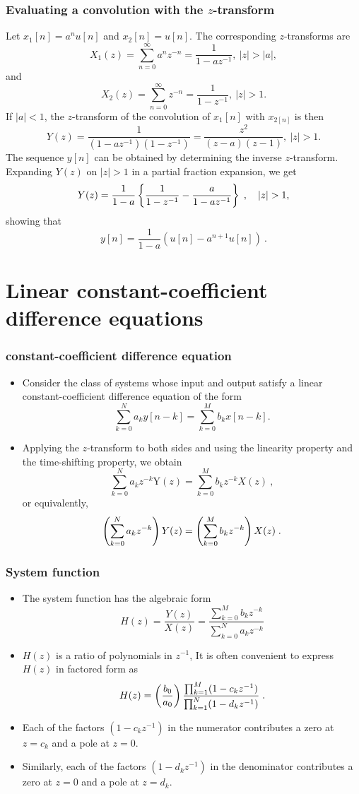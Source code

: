 \begin{frame}
\frametitle{Evaluating a convolution with the $z$-transform}
Let $x_{1}[n]=a^{n}u[n]$ and $x_{2}[n]=u[n]$. The corresponding $z$-transforms are
$$
X_{1}(z)=\sum_{n=0}^{\infty}a^{n}z^{-n}=\frac{1}{1-az^{-1}},\ |z|>|a|,
$$
and
$$
X_{2}(z)=\sum_{n=0}^{\infty}z^{-n}=\frac{1}{1-z^{-1}},\ |z|>1.
$$
If $|a|<1$, the $z$-transform of the convolution of $x_{1}[n]$ with $x_{2[n]}$ is then
$$
Y(z)=\frac{1}{(1-az^{-1})(1-z^{-1})}=\frac{z^{2}}{(z-a)(z-1)},\ |z|>1.
$$
The sequence $y[n]$ can be obtained by determining the inverse $z$-transform. Expanding $Y(z)$ on $|z|> 1$ in a partial fraction expansion, we get
$$
Y(z)=\frac{1}{1-a} \left\{ \frac{1}{1-z^{-1}}-\frac{a}{1-az^{-1}} \right\} \eqsp, \quad |z|>1,
$$
showing that
$$
y[n]=\frac{1}{1-a}(u[n]-a^{n+1}u[n])\ .
$$
\end{frame}


\section{Linear constant-coefficient difference equations}
\begin{frame}
\frametitle{constant-coefficient difference equation}
\begin{itemize}
\item Consider the class of systems whose input and output satisfy a linear constant-coefficient difference equation of the form
\alert{
$$
\sum_{k=0}^{N}a_{k}y[n-k]=\sum_{k=0}^{M}b_{k}x[n-k].
$$
}
\item Applying the $z$-transform to both sides  and using the \alert{linearity property} and the \alert{time-shifting} property,
we obtain
$$
\sum_{k=0}^{N}a_{k}z^{-k}\mathrm{Y}(z)=\sum_{k=0}^{M}b_{k}z^{-k}X(z)\ ,
$$
or equivalently,
$$
\left(\sum_{k=0}^{N}a_{k}z^{-k} \right) Y(z)= \left(\sum_{k=0}^{M}b_{k}z^{-k} \right) X(z) \;.
$$
\end{itemize}
\end{frame}

\begin{frame}
\frametitle{System function}
\begin{itemize}
\item The system function has the algebraic form
$$
H(z)=\frac{Y(z)}{X(z)}=\frac{\sum_{k=0}^{M}b_{k}z^{-k}}{\sum_{k=0}^{N}a_{k}z^{-k}}
$$
\item $H(z)$  is a ratio of polynomials in $z^{-1}$, It is often convenient to express $H(z)$ in factored form as
$$
H(z)=\left(\frac{b_{0}}{a_{0}} \right)\frac{\prod_{k=1}^M (1-c_{k}z^{-1})}{\prod_{k=1}^{N}(1-d_{k}z^{-1})} \;.
$$
\item Each of the factors $(1-c_{k}z^{-1})$ in the numerator contributes a zero at $z=c_{k}$ and a pole at $z=0$.
\item Similarly, each of the factors $(1-d_{k}z^{-1})$ in the denominator contributes a zero at $z=0$ and a pole at $z=d_{k}$.
\end{itemize}
\end{frame}


